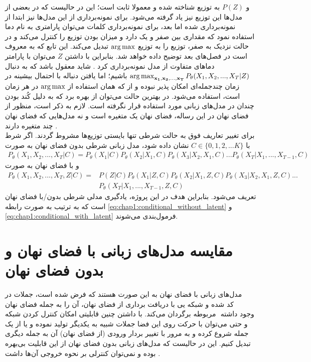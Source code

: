 و $P(Z)$ به توزیع
شناخته شده و معمولا ثابت است؛ این در حالیست که در بعضی از مدل‌ها این توزیع نیز یاد گرفته می‌شود. برای نمونه‌برداری از این مدل‌ها نیز ابتدا از \priordist{} نمونه‌برداری شده اما بعد، برای نمونه‌برداری کلمات می‌توان پارامتری به نام دما استفاده نمود که مقداری بین صفر و یک دارد و میزان 
بودن توزیع را کنترل می‌کند و در حالت نزدیک به صفر، توزیع را به توزیع $\operatorname*{arg\,max}$ تبدیل می‌کند. این تابع که به  معروف است در فصل‌های بعد توضیح داده خواهد شد. بنابراین با داشتن $Z$ می‌توان با پارامتر دما‌های متفاوت از مدل نمونه‌برداری کرد \cite{toward}. شاید معقول باشد که به دنبال
$\operatorname*{arg\,max}_{{\bf x_1}, {\bf x_2}, ..., {\bf x_T}} P_\theta(X_1, X_2, ... , X_T|Z)$
باشیم؛ اما یافتن دنباله با احتمال بیشینه در زمان چندجمله‌ای امکان پذیر نبوده و از \greedydecoding{} که همان استفاده از $\operatorname*{arg\,max}$ در هر زمان است، استفاده می‌شود. در بهترین حالت می‌توان از
بهره برد که به دلیل کُند بودن چندان در مدل‌های زبانی مورد استفاده قرار نگرفته است. لازم به ذکر است، منظور از فضای نهان در این رساله، فضای نهان یک متغیره است و نه مدل‌هایی که فضای نهان چند متغیره دارند \cite{vae_multilevel}.
\\
برای تغییر تعاریف فوق به حالت شرطی تنها بایستی توزیع‌ها مشروط گردند. اگر شرط با $C \in \{0,1,2,...K\}$ نشان داده شود، مدل زبانی شرطی بدون فضای نهان به صورت
\begin{align} \label{eq:chap1:conditional_without_latent}
	P_\theta(X_1, X_2, ... , X_T|C) = P_\theta(X_1|C) P_\theta(X_2|X_1,C) P_\theta(X_3|X_2, X_1,C) ... P_\theta(X_T|X_1, ..., X_{T-1},C)
\end{align}
و با فضای نهان به صورت
\begin{align} \label{eq:chap1:conditional_with_latent}
	P_\theta(X_1, X_2, ... , X_T,Z|C) = & P(Z|C) P_\theta(X_1|Z,C) P_\theta(X_2|X_1,Z,C) P_\theta(X_3|X_2, X_1,Z,C) ... \nonumber \\& P_\theta(X_T|X_1, ..., X_{T-1},Z,C)
\end{align}
تعریف می‌شود. بنابراین هدف در این پروژه، یادگیری مدلی شرطی بدون/با فضای نهان است که به ترتیب به صورت رابطه \ref{eq:chap1:conditional_without_latent} و \ref{eq:chap1:conditional_with_latent} فرمول‌بندی می‌شوند.
\section{مقایسه مدل‌های زبانی با فضای نهان و بدون فضای نهان} \label{chap1:latent_or_not}
مدل‌های زبانی با فضای نهان به این صورت هستند که فرض شده است، جملات در فضای نهان ‎کد شده و شبکه 
یی 
با دریافت برداری از فضای نهان، آن را به جمله مربوطه برگردان می‌کند. با داشتن چنین قابلیتی امکان کنترل کردن شبکه ‎\decoder{}‎ وجود داشته و حتی می‌توان با حرکت روی این فضا جملات شبیه به یکدیگر تولید نموده و یا از یک جمله شروع کرده و به مرور با تغییر بردار ورودی (از فضای نهان) آن به جمله دیگری تبدیل کنیم. این در حالیست که مدل‌های زبانی بدون فضای نهان از این قابلیت بی‌بهره بوده و نمی‌توان کنترلی بر نحوه خروجی آن‌ها داشت \cite{vae_text}.
